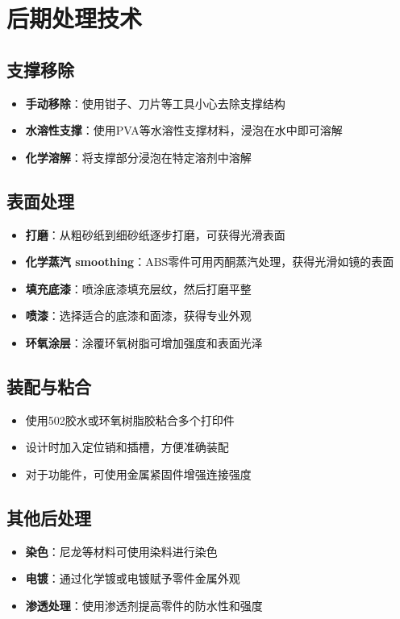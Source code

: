 \documentclass[12pt,UTF8]{ctexbook}
\begin{document}
\section{后期处理技术}

\subsection{支撑移除}
\begin{itemize}
\item \textbf{手动移除}：使用钳子、刀片等工具小心去除支撑结构
\item \textbf{水溶性支撑}：使用PVA等水溶性支撑材料，浸泡在水中即可溶解
\item \textbf{化学溶解}：将支撑部分浸泡在特定溶剂中溶解
\end{itemize}

\subsection{表面处理}
\begin{itemize}
\item \textbf{打磨}：从粗砂纸到细砂纸逐步打磨，可获得光滑表面
\item \textbf{化学蒸汽 smoothing}：ABS零件可用丙酮蒸汽处理，获得光滑如镜的表面
\item \textbf{填充底漆}：喷涂底漆填充层纹，然后打磨平整
\item \textbf{喷漆}：选择适合的底漆和面漆，获得专业外观
\item \textbf{环氧涂层}：涂覆环氧树脂可增加强度和表面光泽
\end{itemize}

\subsection{装配与粘合}
\begin{itemize}
\item 使用502胶水或环氧树脂胶粘合多个打印件
\item 设计时加入定位销和插槽，方便准确装配
\item 对于功能件，可使用金属紧固件增强连接强度
\end{itemize}

\subsection{其他后处理}
\begin{itemize}
\item \textbf{染色}：尼龙等材料可使用染料进行染色
\item \textbf{电镀}：通过化学镀或电镀赋予零件金属外观
\item \textbf{渗透处理}：使用渗透剂提高零件的防水性和强度
\end{itemize}
\end{document}
